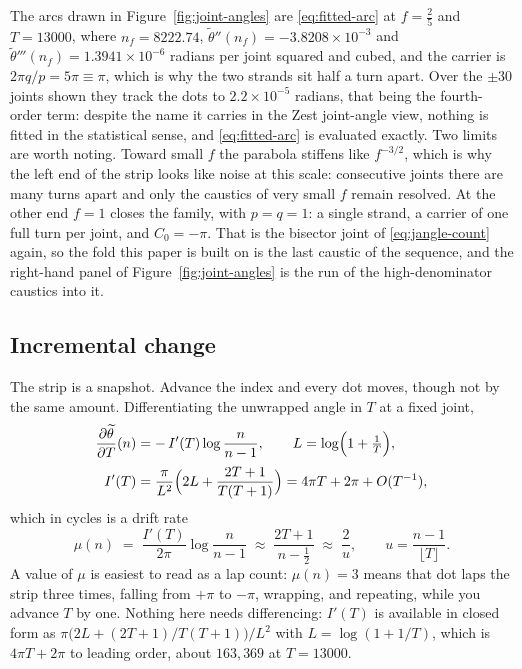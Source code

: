 \documentclass[11pt]{article}
\theoremstyle{definition}
\begin{document}
The arcs drawn in Figure~\ref{fig:joint-angles} are \eqref{eq:fitted-arc} at
$f=\tfrac25$ and $T=13000$, where $n_f=8222.74$,
$\widetilde\theta''(n_f)=-3.8208\times10^{-3}$ and
$\widetilde\theta'''(n_f)=1.3941\times10^{-6}$ radians per joint squared and
cubed, and the carrier is $2\pi q/p=5\pi\equiv\pi$, which is why the two strands
sit half a turn apart. Over the $\pm30$ joints shown they track the dots to
$2.2\times10^{-5}$ radians, that being the fourth-order term: despite the name it
carries in the Zest joint-angle view, nothing is fitted in the statistical sense,
and \eqref{eq:fitted-arc} is evaluated exactly. Two limits are worth noting.
Toward small $f$ the parabola stiffens like $f^{-3/2}$, which is why the
left end of the strip looks like noise at this scale: consecutive joints there
are many turns apart and only the caustics of very small $f$ remain resolved. At
the other end $f=1$ closes the family, with $p=q=1$: a single strand, a carrier of
one full turn per joint, and $C_0=-\pi$. That is the bisector joint of
\eqref{eq:jangle-count} again, so the fold this paper is built on is the last
caustic of the sequence, and the right-hand panel of
Figure~\ref{fig:joint-angles} is the run of the high-denominator caustics into
it.

\subsection{Incremental change}\label{sec:incremental}

The strip is a snapshot. Advance the index and every dot moves, though not by
the same amount. Differentiating the unwrapped angle in $T$ at a fixed joint,
\begin{equation}\label{eq:jangle-drift}
\begin{aligned}
\frac{\partial\widetilde\theta}{\partial T}(n)&=-\,I'(T)\log\frac{n}{n-1},
\qquad L=\log\Bigl(1+\tfrac1T\Bigr),\\[2pt]
I'(T)&=\frac{\pi}{L^{2}}\Bigl(2L+\frac{2T+1}{T(T+1)}\Bigr)
=4\pi T+2\pi+O(T^{-1}),
\end{aligned}
\end{equation}
which in cycles is a drift rate
\begin{equation}\label{eq:jangle-drift-cycles}
\mu(n)\;=\;\frac{I'(T)}{2\pi}\log\frac{n}{n-1}
\;\approx\;\frac{2T+1}{n-\tfrac12}\;\approx\;\frac{2}{u},
\qquad u=\frac{n-1}{\lfloor T\rfloor}.
\end{equation}
A value of $\mu$ is easiest to read as a lap count: $\mu(n)=3$ means that dot
laps the strip three times, falling from $+\pi$ to $-\pi$, wrapping, and
repeating, while you advance $T$ by one. Nothing here needs differencing:
$I'(T)$ is available in closed form as
$\pi\bigl(2L+(2T+1)/T(T+1)\bigr)/L^{2}$ with $L=\log(1+1/T)$, which is
$4\pi T+2\pi$ to leading order, about $163{,}369$ at $T=13000$.
\end{document}
